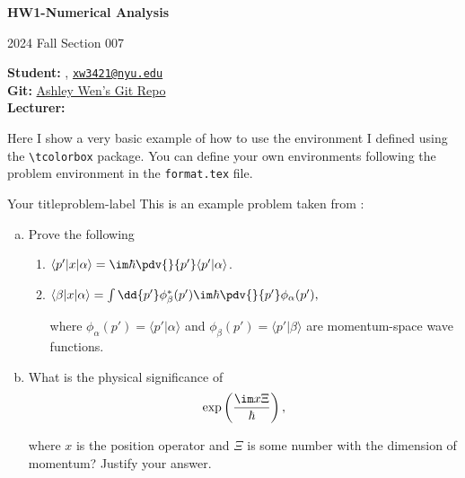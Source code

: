 





\begin{Large}
    \textsf{\textbf{HW1-Numerical Analysis}}
    
    2024 Fall Section 007
\end{Large}

\vspace{1ex}

\textsf{\textbf{Student:}} , \href{mailto:your.email@hotmail.com}{\texttt{xw3421@nyu.edu}}\\
\textsf{\textbf{Git:}} \href{https://github.com/Ashstar9527/AW-Numerical-Analysis}{Ashley Wen's Git Repo}\\
\textsf{\textbf{Lecturer:}} 


\vspace{2ex}

Here I show a very basic example of how to use the  environment I defined using the \verb|\tcolorbox| package. You can define your own environments following the problem environment in the \texttt{format.tex} file.

\begin{problem}{Your title}{problem-label}
This is an example problem taken from \cite{Sakurai2020}:

\begin{enumerate}[(a)]
    \item Prove the following
    \begin{enumerate}[label = (\roman*)]
        \item $\langle p' | x | \alpha \rangle = \im \hbar \pdv{}{p'} \langle p' | \alpha \rangle$.

        \item $\langle \beta | x | \alpha \rangle = \int \dd{p'} \phi_{\beta}^{*} (p') \im \hbar \pdv{}{p'} \phi_{\alpha} (p'),$

        where $\phi_{\alpha}(p') = \langle p' | \alpha \rangle$ and $\phi_{\beta}(p') = \langle p' | \beta \rangle$ are momentum-space wave functions.
    \end{enumerate}

    \item What is the physical significance of 
    \[
    \exp\left(\dfrac{\im x \Xi}{\hbar}\right),
    \]

    where $x$ is the position operator and $\Xi$ is some number with the dimension of momentum? Justify your answer.
\end{enumerate}
\end{problem}

